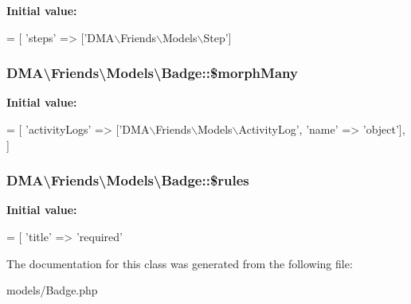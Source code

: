 {\bfseries Initial value\-:}
\begin{DoxyCode}
= [
        \textcolor{stringliteral}{'steps'} => [\textcolor{stringliteral}{'DMA\(\backslash\)Friends\(\backslash\)Models\(\backslash\)Step'}]
\end{DoxyCode}
\hypertarget{classDMA_1_1Friends_1_1Models_1_1Badge_a239fed984baad287f15badaaece428ff}{
\subsubsection[{\$morph\-Many}]{\setlength{\rightskip}{0pt plus 5cm}D\-M\-A\textbackslash{}\-Friends\textbackslash{}\-Models\textbackslash{}\-Badge\-::\$morph\-Many}}\label{classDMA_1_1Friends_1_1Models_1_1Badge_a239fed984baad287f15badaaece428ff}
{\bfseries Initial value\-:}
\begin{DoxyCode}
= [
        \textcolor{stringliteral}{'activityLogs'}  => [\textcolor{stringliteral}{'DMA\(\backslash\)Friends\(\backslash\)Models\(\backslash\)ActivityLog'}, \textcolor{stringliteral}{'name'} => \textcolor{stringliteral}{'object'}],
    ]
\end{DoxyCode}
\hypertarget{classDMA_1_1Friends_1_1Models_1_1Badge_ab750ee2c75af273ca930a12b1a20b3ae}{
\subsubsection[{\$rules}]{\setlength{\rightskip}{0pt plus 5cm}D\-M\-A\textbackslash{}\-Friends\textbackslash{}\-Models\textbackslash{}\-Badge\-::\$rules}}\label{classDMA_1_1Friends_1_1Models_1_1Badge_ab750ee2c75af273ca930a12b1a20b3ae}
{\bfseries Initial value\-:}
\begin{DoxyCode}
= [ 
        \textcolor{stringliteral}{'title'} => \textcolor{stringliteral}{'required'}
\end{DoxyCode}


The documentation for this class was generated from the following file\-:\begin{DoxyCompactItemize}
\item 
models/Badge.\-php\end{DoxyCompactItemize}
